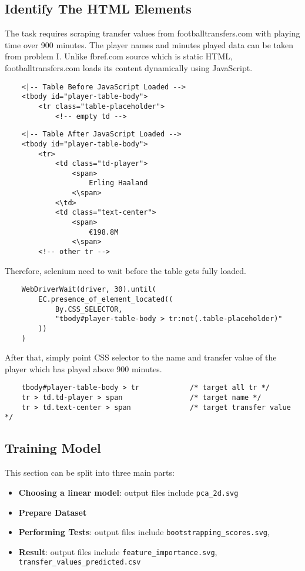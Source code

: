 \documentclass{report}
\begin{document}
\subsection{Identify The HTML Elements}
The task requires scraping transfer values from footballtransfers.com with playing time over 900 
minutes. The player names and minutes played data can be taken from problem I. Unlike fbref.com 
source which is static HTML, footballtransfers.com loads its content dynamically using JavaScript.
\begin{verbatim}
    <|-- Table Before JavaScript Loaded -->
    <tbody id="player-table-body">
        <tr class="table-placeholder">
            <!-- empty td -->
\end{verbatim}
\begin{verbatim}
    <|-- Table After JavaScript Loaded -->
    <tbody id="player-table-body">
        <tr>
            <td class="td-player">
                <span>
                    Erling Haaland
                <\span>
            <\td>
            <td class="text-center">
                <span>
                    €198.8M
                <\span>
        <!-- other tr -->
\end{verbatim}

\noindent Therefore, selenium need to wait before the table gets fully loaded.
\begin{verbatim}
    WebDriverWait(driver, 30).until(
        EC.presence_of_element_located((
            By.CSS_SELECTOR, 
            "tbody#player-table-body > tr:not(.table-placeholder)"
        ))
    )
\end{verbatim}

\noindent After that, simply point CSS selector to the name and transfer value of the player which has played
above 900 minutes.
\begin{verbatim}
    tbody#player-table-body > tr            /* target all tr */
    tr > td.td-player > span                /* target name */
    tr > td.text-center > span              /* target transfer value */ 
\end{verbatim}

\subsection{Training Model}
This section can be split into three main parts:
\begin{itemize}
    \item \textbf{Choosing a linear model}: output files include \verb|pca_2d.svg|
    \item \textbf{Prepare Dataset} 
    \item \textbf{Performing Tests}: output files include \verb|bootstrapping_scores.svg|,
    \item \textbf{Result}: output files include \verb|feature_importance.svg|, 
    \verb|transfer_values_predicted.csv|
\end{itemize}
\end{document}
